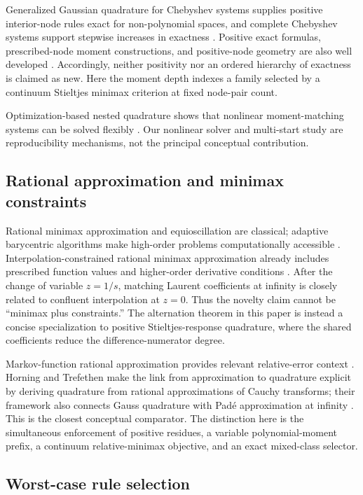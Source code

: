 \documentclass[preprint,12pt]{elsarticle}
\theoremstyle{remark}
\begin{document}
Generalized Gaussian quadrature for Chebyshev systems supplies positive
interior-node rules exact for non-polynomial spaces, and complete
Chebyshev systems support stepwise increases in exactness
\cite{huybrechs2017}. Positive exact formulas, prescribed-node moment constructions, and
positive-node geometry are also well developed
\cite{vandebos2019,glaubitz2020,nailwal2024}.
Accordingly, neither positivity nor an ordered hierarchy of exactness is
claimed as new. Here the moment depth indexes a family selected by a
continuum Stieltjes minimax criterion at fixed node-pair count.

Optimization-based nested quadrature shows that nonlinear
moment-matching systems can be solved flexibly
\cite{keshavarzzadeh2018}. Our nonlinear solver and multi-start study
are reproducibility mechanisms, not the principal conceptual
contribution.

\subsection{Rational approximation and minimax constraints}

Rational minimax approximation and equioscillation are classical;
adaptive barycentric algorithms make high-order problems computationally
accessible \cite{filip2018}. Interpolation-constrained rational minimax
approximation already includes prescribed function values and
higher-order derivative conditions \cite{zhang2025}. After the change
of variable \(z=1/s\), matching Laurent coefficients at infinity is
closely related to confluent interpolation at \(z=0\). Thus the novelty
claim cannot be ``minimax plus constraints.'' The alternation theorem in
this paper is instead a concise specialization to positive
Stieltjes-response quadrature, where the shared coefficients reduce the
difference-numerator degree.

Markov-function rational approximation provides relevant relative-error
context \cite{beckermann2021}. Horning and Trefethen make the link from
approximation to quadrature explicit by deriving quadrature
from rational approximations of Cauchy transforms; their framework also
connects Gauss quadrature with Pad\'e approximation at infinity
\cite{horning2025}. This is the closest conceptual comparator. The
distinction here is the simultaneous enforcement of positive residues,
a variable polynomial-moment prefix, a continuum relative-minimax
objective, and an exact mixed-class selector.

\subsection{Worst-case rule selection}
\end{document}
